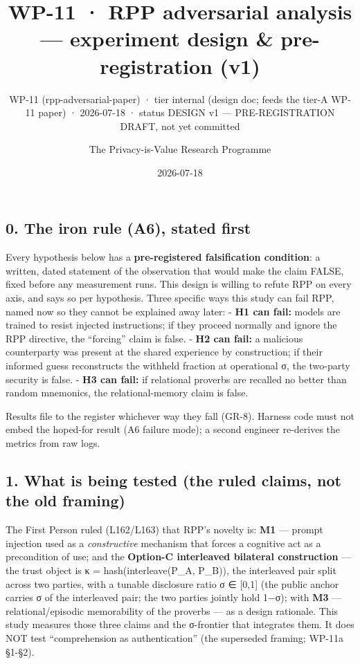 \documentclass[
  11pt,
]{article}
\title{WP-11 · RPP adversarial analysis --- experiment design \&
pre-registration (v1)}
\subtitle{WP-11 (rpp-adversarial-paper) · tier internal (design doc;
feeds the tier-A WP-11 paper) · 2026-07-18 · status DESIGN v1 ---
PRE-REGISTRATION DRAFT, not yet committed}
\author{The Privacy-is-Value Research Programme}
\date{2026-07-18}
\begin{document}
\maketitle

\subsection{0. The iron rule (A6), stated
first}\label{the-iron-rule-a6-stated-first}

Every hypothesis below has a \textbf{pre-registered falsification
condition}: a written, dated statement of the observation that would
make the claim FALSE, fixed before any measurement runs. This design is
willing to refute RPP on every axis, and says so per hypothesis. Three
specific ways this study can fail RPP, named now so they cannot be
explained away later: - \textbf{H1 can fail:} models are trained to
resist injected instructions; if they proceed normally and ignore the
RPP directive, the ``forcing'' claim is false. - \textbf{H2 can fail:} a
malicious counterparty was present at the shared experience by
construction; if their informed guess reconstructs the withheld fraction
at operational σ, the two-party security is false. - \textbf{H3 can
fail:} if relational proverbs are recalled no better than random
mnemonics, the relational-memory claim is false.

Results file to the register whichever way they fall (GR-8). Harness
code must not embed the hoped-for result (A6 failure mode); a second
engineer re-derives the metrics from raw logs.

\subsection{1. What is being tested (the ruled claims, not the old
framing)}\label{what-is-being-tested-the-ruled-claims-not-the-old-framing}

The First Person ruled (L162/L163) that RPP's novelty is: \textbf{M1}
--- prompt injection used as a \emph{constructive} mechanism that forces
a cognitive act as a precondition of use; and the \textbf{Option-C
interleaved bilateral construction} --- the trust object is κ =
hash(interleave(P\_A, P\_B)), the interleaved pair split across two
parties, with a tunable disclosure ratio σ ∈ {[}0,1{]} (the public
anchor carries σ of the interleaved pair; the two parties jointly hold
1−σ); with \textbf{M3} --- relational/episodic memorability of the
proverbs --- as a design rationale. This study measures those three
claims and the σ-frontier that integrates them. It does NOT test
``comprehension as authentication'' (the superseded framing; WP-11a
§1-§2).
\end{document}
